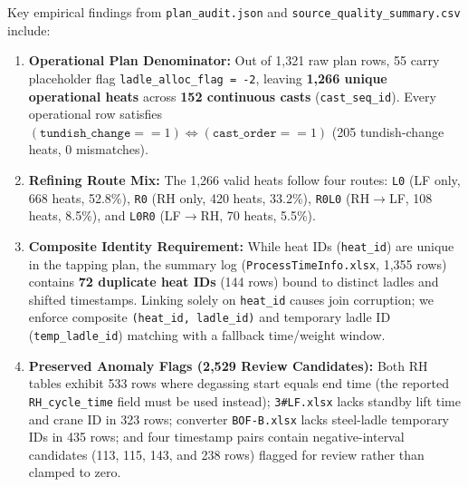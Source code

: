 \documentclass[11pt,a4paper]{article}
\begin{document}
Key empirical findings from \texttt{plan\_audit.json} and \texttt{source\_quality\_summary.csv} include:
\begin{enumerate}[leftmargin=1.5em,itemsep=2pt]
  \item \textbf{Operational Plan Denominator:} Out of 1,321 raw plan rows, 55 carry placeholder flag \texttt{ladle\_alloc\_flag = -2}, leaving \textbf{1,266 unique operational heats} across \textbf{152 continuous casts} (\texttt{cast\_seq\_id}). Every operational row satisfies $(\texttt{tundish\_change} == 1) \Leftrightarrow (\texttt{cast\_order} == 1)$ (205 tundish-change heats, 0 mismatches).
  \item \textbf{Refining Route Mix:} The 1,266 valid heats follow four routes: \texttt{L0} (LF only, 668 heats, 52.8\%), \texttt{R0} (RH only, 420 heats, 33.2\%), \texttt{R0L0} (RH$\rightarrow$LF, 108 heats, 8.5\%), and \texttt{L0R0} (LF$\rightarrow$RH, 70 heats, 5.5\%).
  \item \textbf{Composite Identity Requirement:} While heat IDs (\texttt{heat\_id}) are unique in the tapping plan, the summary log (\texttt{ProcessTimeInfo.xlsx}, 1,355 rows) contains \textbf{72 duplicate heat IDs} (144 rows) bound to distinct ladles and shifted timestamps. Linking solely on \texttt{heat\_id} causes join corruption; we enforce composite \texttt{(heat\_id, ladle\_id)} and temporary ladle ID (\texttt{temp\_ladle\_id}) matching with a fallback time/weight window.
  \item \textbf{Preserved Anomaly Flags (2,529 Review Candidates):} Both RH tables exhibit 533 rows where degassing start equals end time (the reported \texttt{RH\_cycle\_time} field must be used instead); \texttt{3\#LF.xlsx} lacks standby lift time and crane ID in 323 rows; converter \texttt{BOF-B.xlsx} lacks steel-ladle temporary IDs in 435 rows; and four timestamp pairs contain negative-interval candidates (113, 115, 143, and 238 rows) flagged for review rather than clamped to zero.
\end{enumerate}
\end{document}
